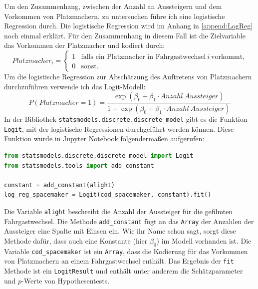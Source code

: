 Um den Zusammenhang, zwischen der Anzahl an Aussteigern und dem Vorkommen von Platzmachern, zu untersuchen führe ich eine logistische Regression durch. Die logistische Regression wird im Anhang in \ref{append:LogReg} noch einmal erklärt. Für den Zusammenhang in diesem Fall ist die Zielvariable das Vorkommen der Platzmacher und kodiert durch:
$$Platzmacher_i = 
	\begin{cases}
		1 & \text{falls ein Platzmacher in Fahrgastwechsel} \ i \ \text{vorkommt,} \\
		0 & \text{sonst.}
	\end{cases}$$
Um die logistische Regression zur Abschätzung des Auftretens von Platzmachern durchzuführen verwende ich das Logit-Modell:
\begin{equation}
P(Platzmacher=1) = \frac{\exp(\beta_0 + \beta_1 \cdot Anzahl \ Aussteiger)}{1+\exp(\beta_0 + \beta_1 \cdot Anzahl \ Aussteiger)}
\end{equation}
In der Bibliothek \texttt{statsmodels.discrete.discrete\_model} gibt es die Funktion \texttt{Logit}, mit der logistische Regressionen durchgeführt werden können. Diese Funktion wurde in \textsf{Jupyter Notebook} folgendermaßen aufgerufen:
\begin{lstlisting}[language=Python]
from statsmodels.discrete.discrete_model import Logit
from statsmodels.tools import add_constant

constant = add_constant(alight)
log_reg_spacemaker = Logit(cod_spacemaker, constant).fit()
\end{lstlisting}
Die Variable \texttt{alight} beschreibt die Anzahl der Aussteiger für die gefilmten Fahrgastwechsel. Die Methode \texttt{add\_constant} fügt an das \texttt{Array} der Anzahlen der Aussteiger eine Spalte mit Einsen ein. Wie ihr Name schon sagt, sorgt diese Methode dafür, dass auch eine Konstante (hier $\beta_0$) im Modell vorhanden ist. Die Variable \texttt{cod\_spacemaker} ist ein \texttt{Array}, dass die Kodierung für das Vorkommen von Platzmachern an einem Fahrgastwechsel enthält. Das Ergebnis der \texttt{fit} Methode ist ein \texttt{LogitResult} und enthält unter anderem die Schätzparameter und $p$-Werte von Hypothesentests.

